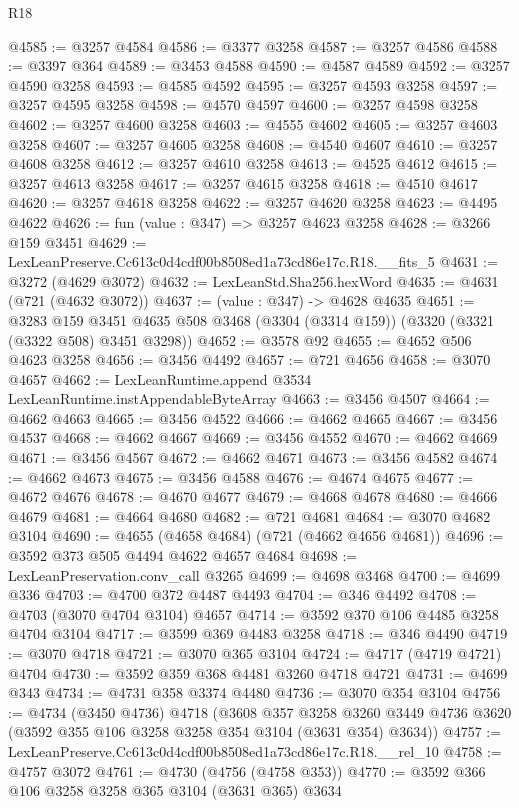 \begin{lexlean}{R18}
\begin{coremodule}
@4585 := @3257 @4584
@4586 := @3377 @3258
@4587 := @3257 @4586
@4588 := @3397 @364
@4589 := @3453 @4588
@4590 := @4587 @4589
@4592 := @3257 @4590 @3258
@4593 := @4585 @4592
@4595 := @3257 @4593 @3258
@4597 := @3257 @4595 @3258
@4598 := @4570 @4597
@4600 := @3257 @4598 @3258
@4602 := @3257 @4600 @3258
@4603 := @4555 @4602
@4605 := @3257 @4603 @3258
@4607 := @3257 @4605 @3258
@4608 := @4540 @4607
@4610 := @3257 @4608 @3258
@4612 := @3257 @4610 @3258
@4613 := @4525 @4612
@4615 := @3257 @4613 @3258
@4617 := @3257 @4615 @3258
@4618 := @4510 @4617
@4620 := @3257 @4618 @3258
@4622 := @3257 @4620 @3258
@4623 := @4495 @4622
@4626 := fun (value : @347) => @3257 @4623 @3258
@4628 := @3266 @159 @3451
@4629 := LexLeanPreserve.Cc613c0d4cdf00b8508ed1a73cd86e17c.R18.__fits_5
@4631 := @3272 (@4629 @3072)
@4632 := LexLeanStd.Sha256.hexWord
@4635 := @4631 (@721 (@4632 @3072))
@4637 := (value : @347) -> @4628 @4635
@4651 := @3283
    @159
    @3451
    @4635
    @508
    @3468
    (@3304 (@3314 @159))
    (@3320 (@3321 (@3322 @508) @3451 @3298))
@4652 := @3578 @92
@4655 := @4652 @506 @4623 @3258
@4656 := @3456 @4492
@4657 := @721 @4656
@4658 := @3070 @4657
@4662 := LexLeanRuntime.append @3534 LexLeanRuntime.instAppendableByteArray
@4663 := @3456 @4507
@4664 := @4662 @4663
@4665 := @3456 @4522
@4666 := @4662 @4665
@4667 := @3456 @4537
@4668 := @4662 @4667
@4669 := @3456 @4552
@4670 := @4662 @4669
@4671 := @3456 @4567
@4672 := @4662 @4671
@4673 := @3456 @4582
@4674 := @4662 @4673
@4675 := @3456 @4588
@4676 := @4674 @4675
@4677 := @4672 @4676
@4678 := @4670 @4677
@4679 := @4668 @4678
@4680 := @4666 @4679
@4681 := @4664 @4680
@4682 := @721 @4681
@4684 := @3070 @4682 @3104
@4690 := @4655 (@4658 @4684) (@721 (@4662 @4656 @4681))
@4696 := @3592 @373 @505 @4494 @4622 @4657 @4684
@4698 := LexLeanPreservation.conv_call @3265
@4699 := @4698 @3468
@4700 := @4699 @336
@4703 := @4700 @372 @4487 @4493
@4704 := @346 @4492
@4708 := @4703 (@3070 @4704 @3104) @4657
@4714 := @3592 @370 @106 @4485 @3258 @4704 @3104
@4717 := @3599 @369 @4483 @3258
@4718 := @346 @4490
@4719 := @3070 @4718
@4721 := @3070 @365 @3104
@4724 := @4717 (@4719 @4721) @4704
@4730 := @3592 @359 @368 @4481 @3260 @4718 @4721
@4731 := @4699 @343
@4734 := @4731 @358 @3374 @4480
@4736 := @3070 @354 @3104
@4756 := @4734
    (@3450 @4736)
    @4718
    (@3608
      @357
      @3258
      @3260
      @3449
      @4736
      @3620
      (@3592 @355 @106 @3258 @3258 @354 @3104 (@3631 @354) @3634))
@4757 := LexLeanPreserve.Cc613c0d4cdf00b8508ed1a73cd86e17c.R18.__rel_10
@4758 := @4757 @3072
@4761 := @4730 (@4756 (@4758 @353))
@4770 := @3592 @366 @106 @3258 @3258 @365 @3104 (@3631 @365) @3634

\end{coremodule}
\end{lexlean}
